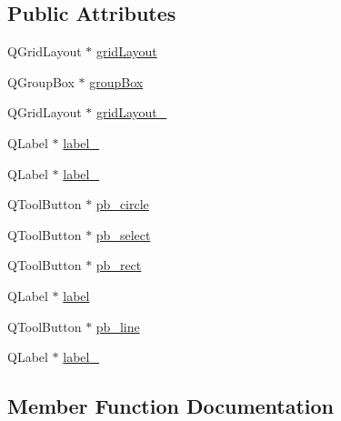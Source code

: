 \subsection*{Public Attributes}
\begin{DoxyCompactItemize}
\item 
Q\+Grid\+Layout $\ast$ \hyperlink{class_ui___drawing_tool_selector_a360ae3a69c31e336af215a424ce2ff9d}{grid\+Layout}
\item 
Q\+Group\+Box $\ast$ \hyperlink{class_ui___drawing_tool_selector_a1be65d4d8fd0c07e7fec52dd16000aaf}{group\+Box}
\item 
Q\+Grid\+Layout $\ast$ \hyperlink{class_ui___drawing_tool_selector_afbefb9a6b3cf7da7737ed2ded7d78a2d}{grid\+Layout\+\_}
\item 
Q\+Label $\ast$ \hyperlink{class_ui___drawing_tool_selector_a02c26b2b0fccb633514b10fc1bd942a7}{label\+\_}
\item 
Q\+Label $\ast$ \hyperlink{class_ui___drawing_tool_selector_a0b0d2d5d874fbe666cbcb6e28ca0c415}{label\+\_}
\item 
Q\+Tool\+Button $\ast$ \hyperlink{class_ui___drawing_tool_selector_a2eafc39b04e16c7670823c5cd3ed702d}{pb\+\_\+circle}
\item 
Q\+Tool\+Button $\ast$ \hyperlink{class_ui___drawing_tool_selector_ab11a181c098447bd1f9aa184e976e0ad}{pb\+\_\+select}
\item 
Q\+Tool\+Button $\ast$ \hyperlink{class_ui___drawing_tool_selector_a17a31b8cff1a2d95abda193b33d36c0e}{pb\+\_\+rect}
\item 
Q\+Label $\ast$ \hyperlink{class_ui___drawing_tool_selector_aae76e8a3a9ecf2af48e1cd43227a8dad}{label}
\item 
Q\+Tool\+Button $\ast$ \hyperlink{class_ui___drawing_tool_selector_afbc78884825da33bd2d95206bfead3e7}{pb\+\_\+line}
\item 
Q\+Label $\ast$ \hyperlink{class_ui___drawing_tool_selector_ab0dafaa90171cf18ca7eff07e4e27512}{label\+\_}
\end{DoxyCompactItemize}


\subsection{Member Function Documentation}
\mbox{\label{class_ui___drawing_tool_selector_a3e822961e2773564eda0c30b90a25425}} 
